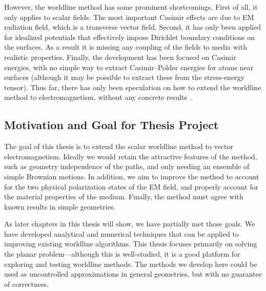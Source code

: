 
However, the worldline method has some prominent shortcomings.  First of all, it only applies 
to scalar fields.
  The most important Casimir effects are due to EM radiation field, 
which is a transverse vector field.
  Second, it has only been applied for idealized potentials that effectively impose 
Dirichlet boundary conditions on the surfaces.  As a result it is missing any 
coupling of the fields to media with realistic properties.
Finally, the development has been focused on Casimir energies, with no simple way to 
extract Casimir--Polder energies for atoms near surfaces 
(although it may be possible to extract these from the stress-energy tensor). 
Thus far, there has only been speculation on how to extend the worldline method to 
electromagnetism, without any concrete results~\citep{Aehlig2011}.  


\subsection{Motivation and Goal for Thesis Project}

The goal of this thesis is to extend the scalar worldline method to vector electromagnetism.
Ideally we would retain the attractive features of the method, such as geometry independence of the paths,
and only needing an ensemble of simple Brownian motions.
In addition, we aim to improve the method to account for the two physical polarization
states of the EM field, and properly account for the material properties of the medium.  
Finally, the method must agree with known results in simple geometries.  

As later chapters in this thesis will show, we have partially met those goals.  We have developed analytical
and numerical techniques that can be applied to improving existing worldline algorithms.
This thesis focuses primarily on solving the planar problem---although this is well-studied,
it is a good platform for exploring and testing worldline methods.  
The methods we develop here could be used as uncontrolled approximations in general geometries, but with
no guarantee of correctness.  


